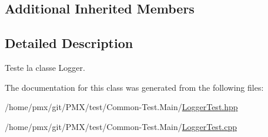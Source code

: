 \subsection*{Additional Inherited Members}


\subsection{Detailed Description}
Teste la classe Logger. 

The documentation for this class was generated from the following files\+:\begin{DoxyCompactItemize}
\item 
/home/pmx/git/\+P\+M\+X/test/\+Common-\/\+Test.\+Main/\hyperlink{LoggerTest_8hpp}{Logger\+Test.\+hpp}\item 
/home/pmx/git/\+P\+M\+X/test/\+Common-\/\+Test.\+Main/\hyperlink{LoggerTest_8cpp}{Logger\+Test.\+cpp}\end{DoxyCompactItemize}
